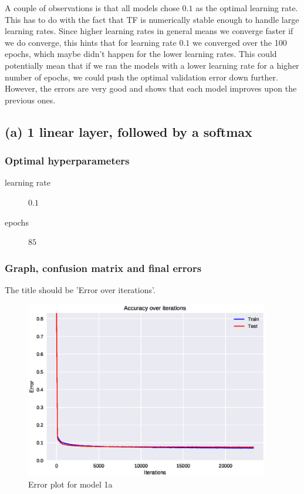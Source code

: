 \documentclass{article}
\begin{document}
A couple of observations is that all models chose $0.1$ as the optimal learning
rate. This has to do with the fact that TF is numerically stable enough to
handle large learning rates. Since higher learning rates in general means we
converge faster if we do converge, this hints that for learning rate $0.1$ we
converged over the 100 epochs, which maybe didn't happen for the lower learning
rates. This could potentially mean that if we ran the models with a lower
learning rate for a higher number of epochs, we could push the optimal
validation error down further. However, the errors are very good and shows that
each model improves upon the previous ones.
\newpage

\subsection{(a) 1 linear layer, followed by a softmax}

\subsubsection{Optimal hyperparameters}

\begin{description}
\item[learning rate] $0.1$
\item[epochs] $85$
\end{description}

\subsubsection{Graph, confusion matrix and final errors}

The title should be 'Error over iterations'.

\begin{figure}[H]
  \centering
  \includegraphics[width=0.95\textwidth]{error_1a.eps}
  \caption{Error plot for model 1a}
  \label{fig:err_1a}
\end{figure}
\end{document}
